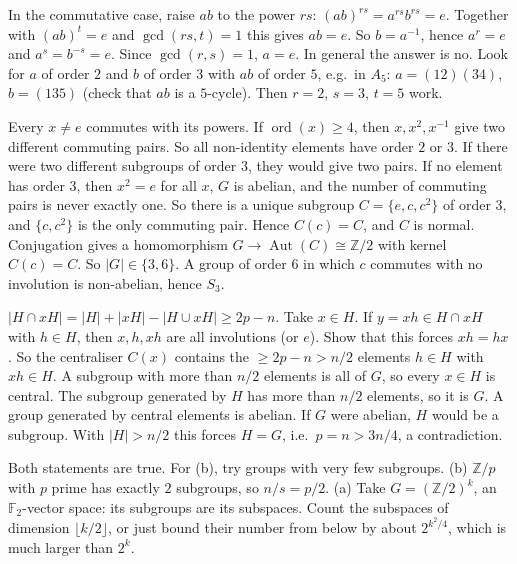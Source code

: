 \documentclass[11pt,a4paper]{article}
\begin{document}

 In the commutative case, raise $ab$ to the power $rs$: $(ab)^{rs}=a^{rs}b^{rs}=e$. Together with $(ab)^t=e$ and $\gcd(rs,t)=1$ this gives $ab=e$.
 So $b=a^{-1}$, hence $a^r=e$ and $a^s=b^{-s}=e$. Since $\gcd(r,s)=1$, $a=e$.
 In general the answer is no. Look for $a$ of order $2$ and $b$ of order $3$ with $ab$ of order $5$, e.g.\ in $A_5$: $a=(12)(34)$, $b=(135)$ (check that $ab$ is a $5$-cycle). Then $r=2$, $s=3$, $t=5$ work.

 Every $x\ne e$ commutes with its powers. If $\operatorname{ord}(x)\ge4$, then $x,x^2,x^{-1}$ give two different commuting pairs. So all non-identity elements have order $2$ or $3$. If there were two different subgroups of order $3$, they would give two pairs.
 If no element has order $3$, then $x^2=e$ for all $x$, $G$ is abelian, and the number of commuting pairs is never exactly one. So there is a unique subgroup $C=\{e,c,c^2\}$ of order $3$, and $\{c,c^2\}$ is the only commuting pair. Hence $C(c)=C$, and $C$ is normal.
 Conjugation gives a homomorphism $G\to\operatorname{Aut}(C)\cong\mathbb Z/2$ with kernel $C(c)=C$. So $|G|\in\{3,6\}$. A group of order $6$ in which $c$ commutes with no involution is non-abelian, hence $S_3$.

 $|H\cap xH|=|H|+|xH|-|H\cup xH|\ge 2p-n$.
 Take $x\in H$. If $y=xh\in H\cap xH$ with $h\in H$, then $x,h,xh$ are all involutions (or $e$). Show that this forces $xh=hx$.
 So the centraliser $C(x)$ contains the $\ge 2p-n>n/2$ elements $h\in H$ with $xh\in H$. A subgroup with more than $n/2$ elements is all of $G$, so every $x\in H$ is central.
 The subgroup generated by $H$ has more than $n/2$ elements, so it is $G$. A group generated by central elements is abelian.
 If $G$ were abelian, $H$ would be a subgroup. With $|H|>n/2$ this forces $H=G$, i.e.\ $p=n>3n/4$, a contradiction.

 Both statements are true. For (b), try groups with very few subgroups.
 (b) $\mathbb Z/p$ with $p$ prime has exactly $2$ subgroups, so $n/s=p/2$. (a) Take $G=(\mathbb Z/2)^k$, an $\mathbb F_2$-vector space: its subgroups are its subspaces. Count the subspaces of dimension $\lfloor k/2\rfloor$, or just bound their number from below by about $2^{k^2/4}$, which is much larger than $2^k$.
\end{document}
